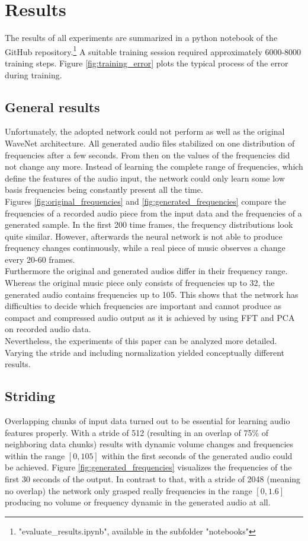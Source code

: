 \documentclass[10pt,conference,compsocconf]{IEEEtran}
\begin{document}
\section{Results}
The results of all experiments are summarized in a python notebook of the GitHub repository.\footnote{"evaluate\_results.ipynb", available in the subfolder "notebooks"} A suitable training session required approximately 6000-8000 training steps. Figure \ref{fig:training_error} plots the typical process of the error during training.\\
\subsection{General results}
 Unfortunately, the adopted network could not perform as well as the original WaveNet architecture. All generated audio files stabilized on one distribution of frequencies after a few seconds. From then on the values of the frequencies did not change any more. Instead of learning the complete range of frequencies, which define the features of the audio input, the network could only learn some low basis frequencies being constantly present all the time.\\
Figures \ref{fig:original_frequencies} and \ref{fig:generated_frequencies} compare the frequencies of a recorded audio piece from the input data and the frequencies of a generated sample. In the first 200 time frames, the frequency distributions look quite similar. However, afterwards the neural network is not able to produce frequency changes continuously, while a real piece of music observes a change every 20-60 frames.\\
Furthermore the original and generated audios differ in their frequency range. Whereas the original music piece only consists of frequencies up to 32, the generated audio contains frequencies up to 105. This shows that the network has difficulties to decide which frequencies are important and cannot produce as compact and compressed audio output as it is achieved by using FFT and PCA on recorded audio data.\\
Nevertheless, the experiments of this paper can be analyzed more detailed. Varying the stride and including normalization yielded conceptually different results.\\
\subsection{Striding}
Overlapping chunks of input data turned out to be essential for learning audio features properly. With a stride of 512 (resulting in an overlap of 75\% of neighboring data chunks) results with dynamic volume changes and frequencies within the range $[0, 105]$ within the first seconds of the generated audio could be achieved. Figure \ref{fig:generated_frequencies} visualizes the frequencies of the first 30 seconds of the output. In contrast to that, with a stride of 2048 (meaning no overlap) the network only grasped really frequencies in the range $[0,1.6]$ producing no volume or frequency dynamic in the generated audio at all.
\end{document}
